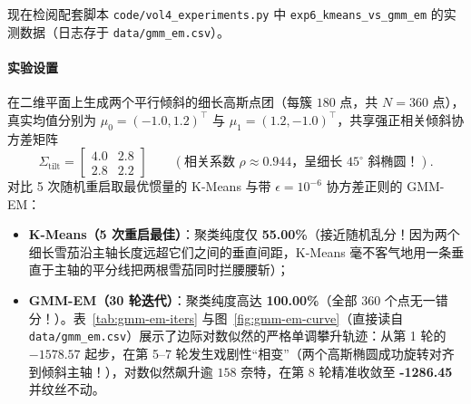 现在检阅配套脚本 \texttt{code/\allowbreak vol4\_experiments.py} 中 \texttt{exp6\_kmeans\_vs\_gmm\_em} 的实测数据（日志存于 \texttt{data/\allowbreak gmm\_em.csv}）。

\paragraph{实验设置}
在二维平面上生成两个平行倾斜的细长高斯点团（每簇 $180$ 点，共 $N = 360$ 点），真实均值分别为 $\mu_0 = (-1.0, 1.2)^\top$ 与 $\mu_1 = (1.2, -1.0)^\top$，共享强正相关倾斜协方差矩阵
\[
  \Sigma_{\mathrm{tilt}} = \begin{bmatrix} 4.0 & 2.8 \\ 2.8 & 2.2 \end{bmatrix}
  \qquad (\text{相关系数 } \rho \approx 0.944\text{，呈细长 } 45^\circ \text{ 斜椭圆！}).
\]
对比 5 次随机重启取最优惯量的 K-Means 与带 $\epsilon = 10^{-6}$ 协方差正则的 GMM-EM：
\begin{itemize}
  \item \textbf{K-Means（5 次重启最佳）}：聚类纯度仅 \textbf{55.00\%}（接近随机乱分！因为两个细长雪茄沿主轴长度远超它们之间的垂直间距，K-Means 毫不客气地用一条垂直于主轴的平分线把两根雪茄同时拦腰腰斩）；
  \item \textbf{GMM-EM（30 轮迭代）}：聚类纯度高达 \textbf{100.00\%}（全部 360 个点无一错分！）。表~\ref{tab:gmm-em-iters} 与图~\ref{fig:gmm-em-curve}（直接读自 \texttt{data/\allowbreak gmm\_em.csv}）展示了边际对数似然的严格单调攀升轨迹：从第 1 轮的 $-1578.57$ 起步，在第 5--7 轮发生戏剧性“相变”（两个高斯椭圆成功旋转对齐到倾斜主轴！），对数似然飙升逾 $158$ 奈特，在第 8 轮精准收敛至 \textbf{-1286.45} 并纹丝不动。
\end{itemize}

